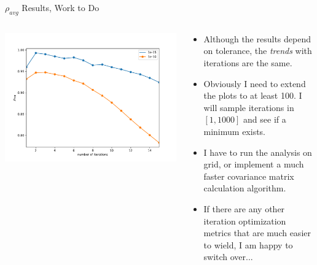 \documentclass[aspectratio=169]{beamer}
\begin{document}
\begin{frame}{$\rho_{avg}$ Results, Work to Do}
  \begin{columns}
    \begin{column}{.55\textwidth}
      \includegraphics[width=\textwidth]{figures/average_rho.pdf}
    \end{column}
    \begin{column}{.45\textwidth}
      \begin{itemize}
        \small
        \item Although the results depend on tolerance, the \emph{trends} with iterations are the same.
        \item Obviously I need to extend the plots to at least 100. I will sample iterations in $[1,1000]$ and see if a minimum exists.
        \item I have to run the analysis on grid, or implement a much faster covariance matrix calculation algorithm.
        \item If there are any other iteration optimization metrics that are much easier to wield, I am happy to switch over...
      \end{itemize}
    \end{column}
  \end{columns}
\end{frame}
\end{document}
